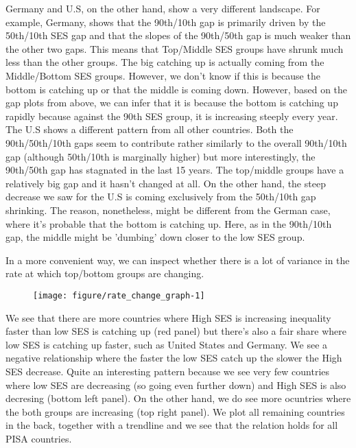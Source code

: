 \documentclass[11pt, a4paper]{article}\usepackage[]{graphicx}\usepackage[]{color}
\begin{document}
Germany and U.S, on the other hand, show a very different landscape. For example, Germany, shows that the 90th/10th gap is primarily driven by the 50th/10th SES gap and that the slopes of the 90th/50th gap is much weaker than the other two gaps. This means that Top/Middle SES groups have shrunk much less than the other groups. The big catching up is actually coming from the Middle/Bottom SES groups. However, we don't know if this is because the bottom is catching up or that the middle is coming down. However, based on the gap plots from above, we can infer that it is because the bottom is catching up rapidly because against the 90th SES group, it is increasing steeply every year. The U.S shows a different pattern from all other countries. Both the 90th/50th/10th gaps seem to contribute rather similarly to the overall 90th/10th gap (although 50th/10th is marginally higher) but more interestingly, the 90th/50th gap has stagnated in the last 15 years. The top/middle groups have a relatively big gap and it hasn't changed at all. On the other hand, the steep decrease we saw for the U.S is coming exclusively from the 50th/10th gap shrinking. The reason, nonetheless, might be different from the German case, where it's probable that the bottom is catching up. Here, as in the 90th/10th gap, the middle might be 'dumbing' down closer to the low SES group.

In a more convenient way, we can inspect whether there is a lot of variance in the rate at which top/bottom groups are changing.



\begin{figure}
\begin{center}


{\centering \texttt{[image: figure/rate\_change\_graph-1]} 

}



\end{center}
\end{figure}

We see that there are more countries where High SES is increasing inequality faster than low SES is catching up (red panel) but there's also a fair share where low SES is catching up faster, such as United States and Germany. We see a negative relationship where the faster the low SES catch up the slower the High SES decrease. Quite an interesting pattern because we see very few countries where low SES are decreasing (so going even further down) and High SES is also decresing (bottom left panel). On the other hand, we do see more ocuntries where the both groups are increasing (top right panel). We plot all remaining countries in the back, together with a trendline and we see that the relation holds for all PISA countries.
\end{document}
